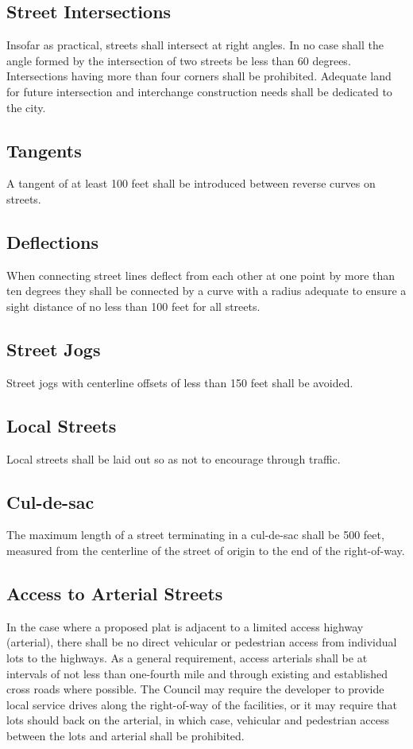 \subsection{Street Intersections}
Insofar as practical, streets shall intersect at right angles.  In no case shall the angle formed by the intersection of two streets be less than 60 degrees. Intersections having more than four corners shall be prohibited. Adequate land for future intersection and interchange construction needs shall be dedicated to the city.
\subsection{Tangents}
A tangent of at least 100 feet shall be introduced between reverse curves on streets.
\subsection{Deflections}
When connecting street lines deflect from each other at one point by more than ten degrees they shall be connected by a curve with a radius adequate to ensure a sight distance of no less than 100 feet for all streets.
\subsection{Street Jogs}
Street jogs with centerline offsets of less than 150 feet shall be avoided.
\subsection{Local Streets}
Local streets shall be laid out so as not to encourage through traffic.
\subsection{Cul-de-sac}
The maximum length of a street terminating in a cul-de-sac shall be 500 feet, measured from the centerline of the street of origin to the end of the right-of-way.
\subsection{Access to Arterial Streets}
In the case where a proposed plat is adjacent to a limited access highway (arterial), there shall be no direct vehicular or pedestrian access from individual lots to the highways. As a general requirement, access arterials shall be at intervals of not less than one-fourth mile and through existing and established cross roads where possible. The Council may require the developer to provide local service drives along the right-of-way of the facilities, or it may require that lots should back on the arterial, in which case, vehicular and pedestrian access between the lots and arterial shall be prohibited.
